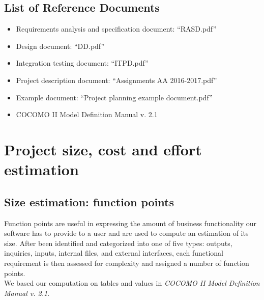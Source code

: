 \documentclass[english]{article}
\begin{document}

\subsection{List of Reference Documents}

\begin{itemize}
	\item{Requirements analysis and specification document: “RASD.pdf”}
	\item{Design document: “DD.pdf”}
	\item{Integration testing document: “ITPD.pdf”}
	\item{Project description document: “Assignments AA 2016-2017.pdf”}
	\item{Example document: “Project planning example document.pdf”}
	\item{COCOMO II Model Definition Manual v. 2.1}
\end{itemize}

\section{Project size, cost and effort estimation}


\subsection{Size estimation: function points}
Function points are useful in expressing the amount of business functionality our software has to provide to a user and are used to compute an estimation of its size.
After been identified and categorized into one of five types: outputs, inquiries, inputs, internal files, and external interfaces, each functional requirement is then assessed for complexity and assigned a number of function points.\\
We based our computation on tables and values in \emph{COCOMO II Model Definition Manual v. 2.1}.
\end{document}
